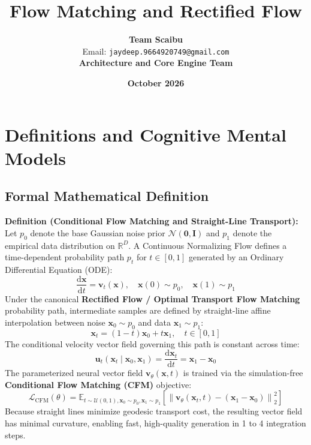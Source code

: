 \documentclass[11pt,a4paper]{article}
\title{\textbf{Flow Matching and Rectified Flow}}
\author{\textbf{Team Scaibu} \\ \small Email: \texttt{jaydeep.9664920749@gmail.com} \\ \small \textbf{Architecture and Core Engine Team}}
\date{\textbf{October 2026}}
\theoremstyle{definition}
\begin{document}
\maketitle

\section{Definitions and Cognitive Mental Models}

\subsection{Formal Mathematical Definition}
\textbf{Definition (Conditional Flow Matching and Straight-Line Transport):}
Let $p_0$ denote the base Gaussian noise prior $\mathcal{N}(\mathbf{0}, \mathbf{I})$ and $p_1$ denote the empirical data distribution on $\mathbb{R}^D$. A Continuous Normalizing Flow defines a time-dependent probability path $p_t$ for $t \in [0, 1]$ generated by an Ordinary Differential Equation (ODE):
{\boldmath
\begin{equation}
\frac{\mathrm{d}\mathbf{x}}{\mathrm{d}t} = \mathbf{v}_t(\mathbf{x}), \quad \mathbf{x}(0) \sim p_0, \quad \mathbf{x}(1) \sim p_1
\end{equation}
}
Under the canonical \textbf{Rectified Flow / Optimal Transport Flow Matching} probability path, intermediate samples are defined by straight-line affine interpolation between noise $\mathbf{x}_0 \sim p_0$ and data $\mathbf{x}_1 \sim p_1$:
{\boldmath
\begin{equation}
\mathbf{x}_t = (1 - t)\mathbf{x}_0 + t \mathbf{x}_1, \quad t \in [0, 1]
\end{equation}
}
The conditional velocity vector field governing this path is constant across time:
{\boldmath
\begin{equation}
\mathbf{u}_t(\mathbf{x}_t \mid \mathbf{x}_0, \mathbf{x}_1) = \frac{\mathrm{d}\mathbf{x}_t}{\mathrm{d}t} = \mathbf{x}_1 - \mathbf{x}_0
\end{equation}
}
The parameterized neural vector field $\mathbf{v}_\theta(\mathbf{x}, t)$ is trained via the simulation-free \textbf{Conditional Flow Matching (CFM)} objective:
{\boldmath
\begin{equation}
\mathcal{L}_{\text{CFM}}(\theta) = \mathbb{E}_{t \sim \mathcal{U}(0, 1), \mathbf{x}_0 \sim p_0, \mathbf{x}_1 \sim p_1}\left[ \left\| \mathbf{v}_\theta(\mathbf{x}_t, t) - (\mathbf{x}_1 - \mathbf{x}_0) \right\|_2^2 \right]
\end{equation}
}
Because straight lines minimize geodesic transport cost, the resulting vector field has minimal curvature, enabling fast, high-quality generation in 1 to 4 integration steps.
\end{document}
